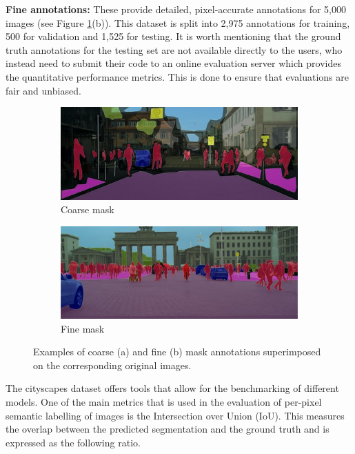 \textbf{Fine annotations:} These provide detailed, pixel-accurate annotations for 5,000 images (see Figure \ref{fig:cityscapes}(b)). This dataset is split into 2,975 annotations for training, 500 for validation and 1,525 for testing. It is worth mentioning that the ground truth annotations for the testing set are not available directly to the users, who instead need to submit their code to an online evaluation server which provides the quantitative performance metrics. This is done to ensure that evaluations are fair and unbiased.

\begin{figure}[ht]
	\begin{subfigure}{.5\textwidth}
		\includegraphics[width=\textwidth]{coarse_example.jpg}
		\caption{Coarse mask}
	\end{subfigure}
	\begin{subfigure}{.5\textwidth}
		\includegraphics[width=\textwidth]{fine_example.jpg}
		\caption{Fine mask}
	\end{subfigure}
	\caption{Examples of coarse (a) and fine (b) mask annotations superimposed on the corresponding original images.}
	\label{fig:cityscapes}
\end{figure}

The cityscapes dataset offers tools that allow for the benchmarking of different models. One of the main metrics that is used in the evaluation of per-pixel semantic labelling of images is the Intersection over Union (IoU). This measures the overlap between the predicted segmentation and the ground truth and is expressed as the following ratio.

